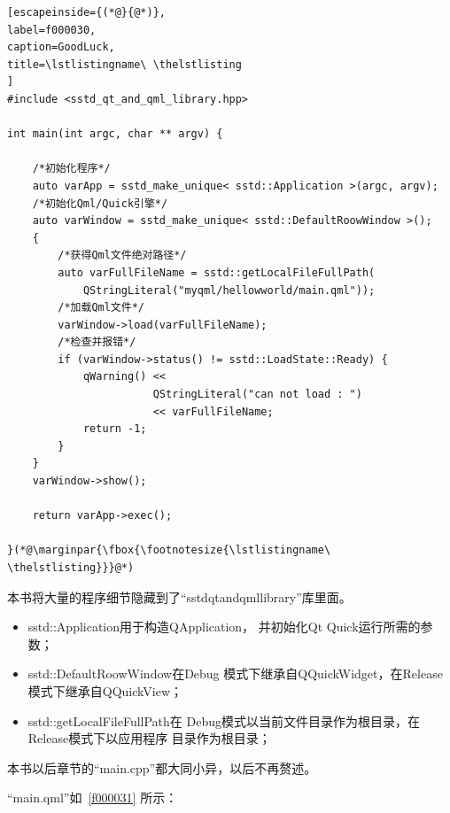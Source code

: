 \FloatBarrier
\begin{lstlisting}[escapeinside={(*@}{@*)},
label=f000030,
caption=GoodLuck,
title=\lstlistingname\ \thelstlisting
]
#include <sstd_qt_and_qml_library.hpp>

int main(int argc, char ** argv) {

    /*初始化程序*/
    auto varApp = sstd_make_unique< sstd::Application >(argc, argv);
    /*初始化Qml/Quick引擎*/
    auto varWindow = sstd_make_unique< sstd::DefaultRoowWindow >();
    {
        /*获得Qml文件绝对路径*/
        auto varFullFileName = sstd::getLocalFileFullPath(
            QStringLiteral("myqml/hellowworld/main.qml"));
        /*加载Qml文件*/
        varWindow->load(varFullFileName);
        /*检查并报错*/
        if (varWindow->status() != sstd::LoadState::Ready) {
            qWarning() <<
                       QStringLiteral("can not load : ")
                       << varFullFileName;
            return -1;
        }
    }
    varWindow->show();

    return varApp->exec();

}(*@\marginpar{\fbox{\footnotesize{\lstlistingname\ \thelstlisting}}}@*)\end{lstlisting}          %

本书将大量的程序细节隐藏到了“sstd\underline{\hspace{0.5em}}qt\underline{\hspace{0.5em}}and\underline{\hspace{0.5em}}qml\underline{\hspace{0.5em}}library”库里面。

\begin{itemize}
\item sstd::Application用于构造QApplication，
并初始化Qt Quick运行所需的参数；
\item sstd::DefaultRoowWindow在Debug
模式下继承自QQuickWidget，在Release模式下继承自QQuickView；
\item sstd::getLocalFileFullPath在
Debug模式以当前文件目录作为根目录，在Release模式下以应用程序
目录作为根目录；
\end{itemize}

本书以后章节的“main.cpp”都大同小异，以后不再赘述。


“main.qml”如\lstlistingname\ \ref{f000031}
所示：

